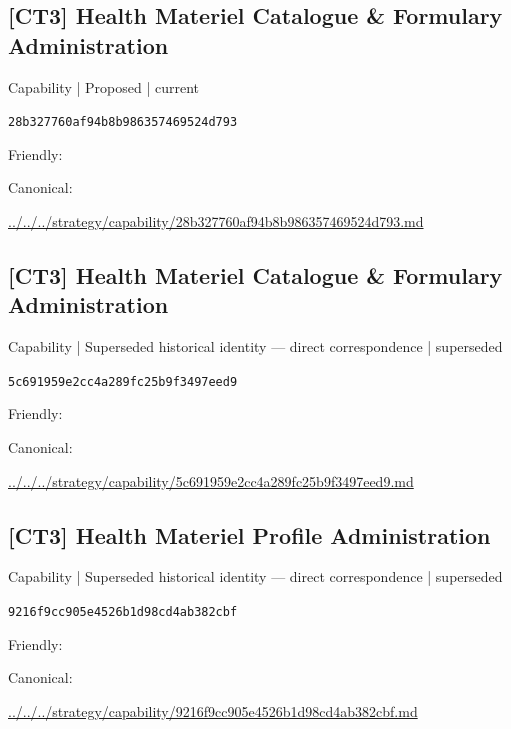 \documentclass[10pt,a4paper]{article}
\begin{document}
\subsection*{[CT3] Health Materiel Catalogue \& Formulary Administration}
{\small Capability | Proposed | current}\par
\texttt{28b327760af94b8b986357469524d793}\par
Friendly: \par
Canonical: \par
{\footnotesize\url{../../../strategy/capability/28b327760af94b8b986357469524d793.md}}\par
\subsection*{[CT3] Health Materiel Catalogue \& Formulary Administration}
{\small Capability | Superseded historical identity — direct correspondence | superseded}\par
\texttt{5c691959e2cc4a289fc25b9f3497eed9}\par
Friendly: \par
Canonical: \par
{\footnotesize\url{../../../strategy/capability/5c691959e2cc4a289fc25b9f3497eed9.md}}\par
\subsection*{[CT3] Health Materiel Profile Administration}
{\small Capability | Superseded historical identity — direct correspondence | superseded}\par
\texttt{9216f9cc905e4526b1d98cd4ab382cbf}\par
Friendly: \par
Canonical: \par
{\footnotesize\url{../../../strategy/capability/9216f9cc905e4526b1d98cd4ab382cbf.md}}\par
\end{document}
